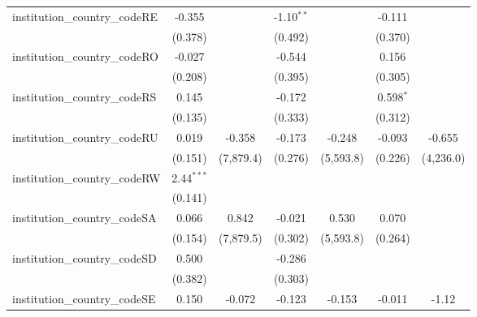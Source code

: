 \begin{tabular}{lcccccc}
   institution\_country\_codeRE          & -0.355         &               & -1.10$^{**}$   &               & -0.111         &   \\   
                                         & (0.378)        &               & (0.492)        &               & (0.370)        &   \\   
   institution\_country\_codeRO          & -0.027         &               & -0.544         &               & 0.156          &   \\   
                                         & (0.208)        &               & (0.395)        &               & (0.305)        &   \\   
   institution\_country\_codeRS          & 0.145          &               & -0.172         &               & 0.598$^{*}$    &   \\   
                                         & (0.135)        &               & (0.333)        &               & (0.312)        &   \\   
   institution\_country\_codeRU          & 0.019          & -0.358        & -0.173         & -0.248        & -0.093         & -0.655\\   
                                         & (0.151)        & (7,879.4)     & (0.276)        & (5,593.8)     & (0.226)        & (4,236.0)\\   
   institution\_country\_codeRW          & 2.44$^{***}$   &               &                &               &                &   \\   
                                         & (0.141)        &               &                &               &                &   \\   
   institution\_country\_codeSA          & 0.066          & 0.842         & -0.021         & 0.530         & 0.070          &   \\   
                                         & (0.154)        & (7,879.5)     & (0.302)        & (5,593.8)     & (0.264)        &   \\   
   institution\_country\_codeSD          & 0.500          &               & -0.286         &               &                &   \\   
                                         & (0.382)        &               & (0.303)        &               &                &   \\   
   institution\_country\_codeSE          & 0.150          & -0.072        & -0.123         & -0.153        & -0.011         & -1.12\\   

\end{tabular}
